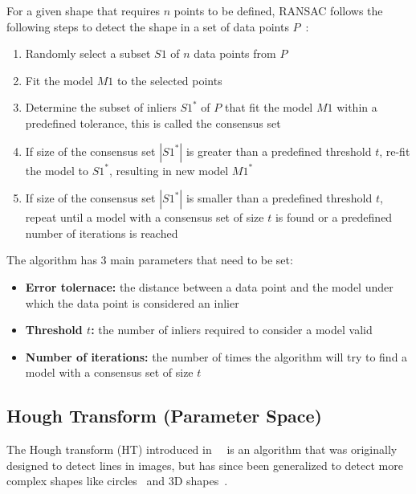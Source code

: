 For a given shape that requires $n$ points to be defined, RANSAC follows the following steps to detect the shape
in a set of data points $P$~\parencite{fischler_random_1981}:
\begin{enumerate}
    \item Randomly select a subset $S1$ of $n$ data points from $P$
    \item Fit the model $M1$ to the selected points
    \item Determine the subset of inliers $S1^*$ of $P$ that fit the model $M1$ within a predefined tolerance, this is called the consensus set
    \item If size of the consensus set $|S1^*|$ is greater than a predefined threshold $t$, re-fit the model to $S1^*$, resulting in new model $M1^*$
    \item If size of the consensus set $|S1^*|$ is smaller than a predefined threshold $t$, repeat until a model with a consensus set of size $t$ is found or a predefined number of iterations is reached
\end{enumerate}

The algorithm has 3 main parameters that need to be set:
\begin{itemize}
    \item \textbf{Error tolernace:} the distance between a data point and the model under which the data point is considered an inlier
    \item \textbf{Threshold $t$:} the number of inliers required to consider a model valid
    \item \textbf{Number of iterations:} the number of times the algorithm will try to find a model with a consensus set of size $t$
\end{itemize}

\subsection{Hough Transform (Parameter Space)}
The Hough transform (HT) introduced in~\citeyear{hough_method_1962}~\parencite{hough_method_1962}
is an algorithm that was originally designed to detect lines in images,
but has since been generalized to detect more complex shapes like circles~\cite{ballard_generalizing_1981} and 3D shapes~\cite{woodford_demisting_2014}.

